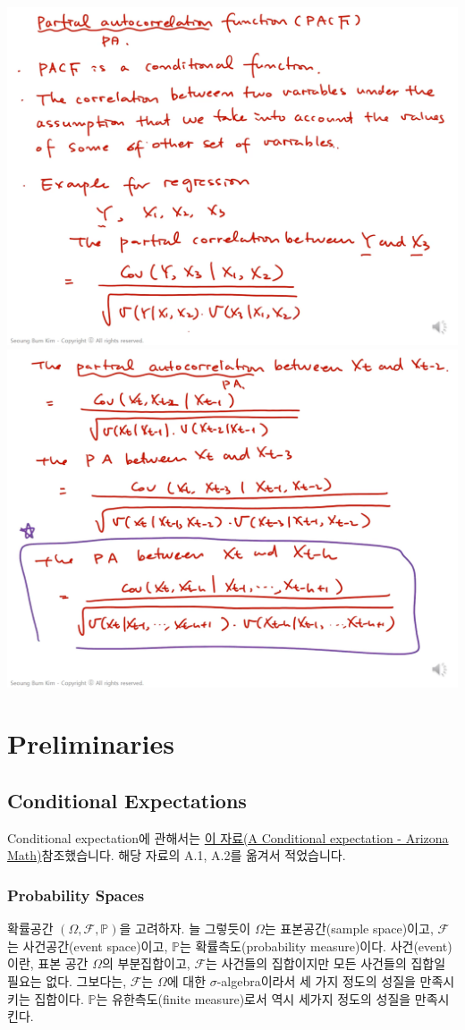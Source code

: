 \documentclass{article}
\begin{document}
\begin{center}
\includegraphics[width=.45\textwidth]{capture_11}
\includegraphics[width=.45\textwidth]{capture_12}
\end{center}

\section{Preliminaries}

\subsection{Conditional Expectations}

Conditional expectation에 관해서는 \href{https://www.math.arizona.edu/~tgk/464_07/cond_exp.pdf}{이 자료(A Conditional expectation - Arizona Math)}참조했습니다.
해당 자료의 A.1, A.2를 옮겨서 적었습니다.

%
\subsubsection{Probability Spaces}
확률공간 \((\Omega,\mathcal F,\mathbb P)\)을 고려하자.
늘 그렇듯이 \(\Omega\)는 표본공간(sample space)이고, \(\mathcal F\)는 사건공간(event space)이고, \(\mathbb P\)는 확률측도(probability measure)이다.
사건(event)이란, 표본 공간 \(\Omega\)의 부분집합이고, \(\mathcal F\)는 사건들의 집합이지만 모든 사건들의 집합일 필요는 없다. 그보다는, \(\mathcal F\)는 \(\Omega\)에 대한 \(\sigma\)-algebra이라서 세 가지 정도의 성질을 만족시키는 집합이다.
\(\mathbb P\)는 유한측도(finite measure)로서 역시 세가지 정도의 성질을 만족시킨다.

%
\end{document}
